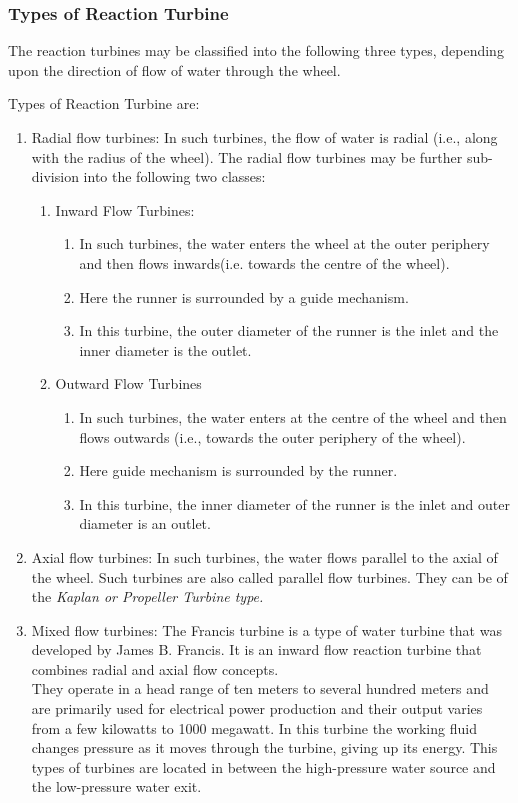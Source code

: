 \documentclass[11pt]{article}
\begin{document}
\subsubsection{Types of Reaction Turbine}

The reaction turbines may be classified into the following three types, depending upon the direction of flow of water through the wheel. 

Types of Reaction Turbine are:
\begin{enumerate}
	\item Radial flow turbines: In such turbines, the flow of water is radial (i.e., along with the radius of the wheel). The radial flow turbines may be further sub-division into the following two classes:
		\begin{enumerate}
			\item Inward Flow Turbines:
				\begin{enumerate}
					\item In such turbines, the water enters the wheel at the outer periphery and then flows inwards(i.e. towards the centre of the wheel).
					\item Here the runner is surrounded by a guide mechanism.
					\item In this turbine, the outer diameter of the runner is the inlet and the inner diameter is the outlet.
				\end{enumerate}
			\item Outward Flow Turbines
				\begin{enumerate}
					\item In such turbines, the water enters at the centre of the wheel and then flows outwards (i.e., towards the outer periphery of the wheel).
					\item Here guide mechanism is surrounded by the runner.
					\item In this turbine, the inner diameter of the runner is the inlet and outer diameter is an outlet.
				\end{enumerate}
		\end{enumerate}
	\item Axial flow turbines: In such turbines, the water flows parallel to the axial of the wheel. Such turbines are also called parallel flow turbines. They can be of the \textit{Kaplan or Propeller Turbine type.}
	
	\item Mixed flow turbines: The Francis turbine is a type of water turbine that was developed by James B. Francis. It is an inward flow reaction turbine that combines radial and axial flow concepts.\\
	They operate in a head range of ten meters to several hundred meters and are primarily used for electrical power production and their output varies from a few kilowatts to 1000 megawatt. In this turbine the working fluid changes pressure as it moves through the turbine, giving up its energy. This types of turbines are located in between the high-pressure water source and the low-pressure water exit.
	
\end{enumerate}
\end{document}
